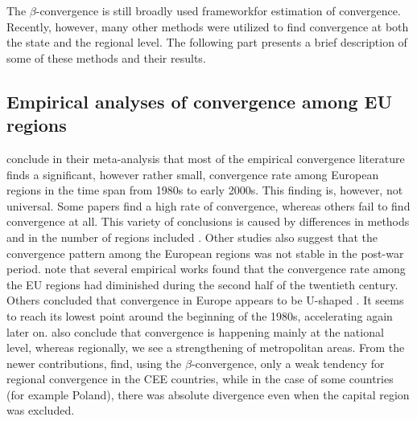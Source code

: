 \documentclass[11pt]{article}
\begin{document}
The $\beta$-convergence is still broadly used frameworkfor estimation of convergence. Recently, however, many other methods were utilized to find convergence at both the state and the regional level. The following part presents a brief description of some of these methods and their results.
  
 \subsection{Empirical analyses of convergence among EU regions}

\citet{eckey2007convergence} conclude in their meta-analysis that most of the empirical convergence literature finds a significant, however rather small, convergence rate among European regions in the time span from 1980s to early 2000s. This finding is, however, not universal. Some papers find a high rate of convergence, whereas others fail to find convergence at all. This variety of conclusions is caused by differences in methods and in the number of regions included \citep{eckey2007convergence}. Other studies also suggest that the convergence pattern among the European regions was not stable in the post-war period. \citet{eckey2007convergence} note that several empirical works found that the convergence rate among the EU regions had diminished during the second half of the twentieth century. Others concluded that convergence in Europe appears to be U-shaped \citep{basile2001regional, geppert2008regional}. It seems to reach its lowest point around the beginning of the 1980s, accelerating again later on. \citet{geppert2008regional} also conclude that convergence is happening mainly at the national level, whereas regionally, we see a strengthening of metropolitan areas. From the newer contributions, \citet*{sme2012regional} find, using the $\beta$-convergence, only a weak tendency for regional convergence in the CEE countries, while in the case of some countries (for example Poland), there was absolute divergence even when the capital region was excluded. %
 
\end{document}
